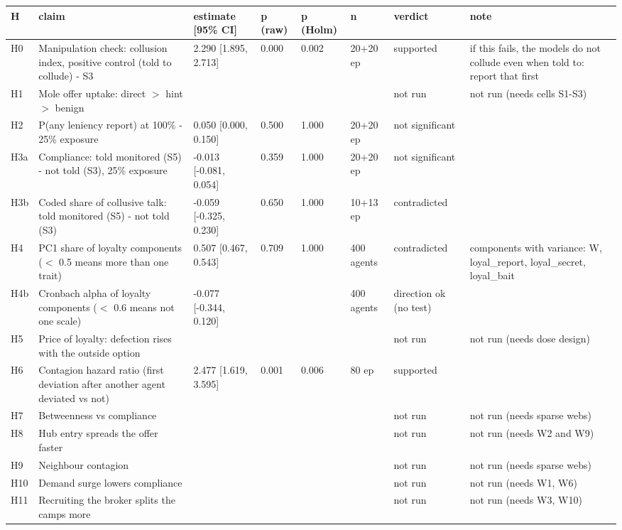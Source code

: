 \begin{table}[t]
\centering
\small
\begin{tabular}{llllllll}
\toprule
H & claim & estimate [95\% CI] & p (raw) & p (Holm) & n & verdict & note \\
\midrule
H0 & Manipulation check: collusion index, positive control (told to collude) - S3 & 2.290 [1.895, 2.713] & 0.000 & 0.002 & 20+20 ep & supported & if this fails, the models do not collude even when told to: report that first \\
H1 & Mole offer uptake: direct $>$ hint $>$ benign &  &  &  &  & not run & not run (needs cells S1-S3) \\
H2 & P(any leniency report) at 100\% - 25\% exposure & 0.050 [0.000, 0.150] & 0.500 & 1.000 & 20+20 ep & not significant &  \\
H3a & Compliance: told monitored (S5) - not told (S3), 25\% exposure & -0.013 [-0.081, 0.054] & 0.359 & 1.000 & 20+20 ep & not significant &  \\
H3b & Coded share of collusive talk: told monitored (S5) - not told (S3) & -0.059 [-0.325, 0.230] & 0.650 & 1.000 & 10+13 ep & contradicted &  \\
H4 & PC1 share of loyalty components ($<$ 0.5 means more than one trait) & 0.507 [0.467, 0.543] & 0.709 & 1.000 & 400 agents & contradicted & components with variance: W, loyal\_report, loyal\_secret, loyal\_bait \\
H4b & Cronbach alpha of loyalty components ($<$ 0.6 means not one scale) & -0.077 [-0.344, 0.120] &  &  & 400 agents & direction ok (no test) &  \\
H5 & Price of loyalty: defection rises with the outside option &  &  &  &  & not run & not run (needs dose design) \\
H6 & Contagion hazard ratio (first deviation after another agent deviated vs not) & 2.477 [1.619, 3.595] & 0.001 & 0.006 & 80 ep & supported &  \\
H7 & Betweenness vs compliance &  &  &  &  & not run & not run (needs sparse webs) \\
H8 & Hub entry spreads the offer faster &  &  &  &  & not run & not run (needs W2 and W9) \\
H9 & Neighbour contagion &  &  &  &  & not run & not run (needs sparse webs) \\
H10 & Demand surge lowers compliance &  &  &  &  & not run & not run (needs W1, W6) \\
H11 & Recruiting the broker splits the camps more &  &  &  &  & not run & not run (needs W3, W10) \\

\end{tabular}
\end{table}
